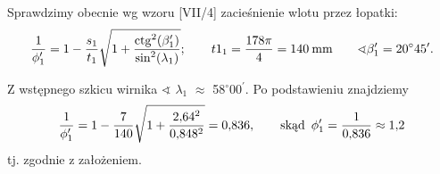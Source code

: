 \documentclass[a4paper]{book}
\DeclareMathOperator{\ctg}{ctg}
\begin{document}
Sprawdzimy obecnie wg wzoru [VII/4] zacieśnienie wlotu przez łopatki:
\begin{gather*}
%
\dfrac{1}{\phi_{1}^\prime} = 1 - \dfrac{s_1}{t_1}\sqrt{\strut 1 + \dfrac{\ctg^2(\beta_{1}^\prime)}{\sin^2(\lambda_1)}}; \qquad t1_1 = \dfrac{178\pi}{4} = 140 \: \text{mm} \qquad \sphericalangle \beta_{1}^\prime = 20^{\circ}45^\prime.
%
\end{gather*}
\par Z wstępnego szkicu wirnika $\sphericalangle$ $\lambda_1$ $\approx$ 58$^{\circ}$00$^\prime.$ Po podstawieniu znajdziemy
\begin{gather*}
%
\dfrac{1}{\phi_1^\prime} = 1 - \dfrac{7}{140}\sqrt{\strut 1 + \dfrac{2{,}64^2}{0{,}848^2}} = 0{,}836, \qquad \text{skąd} \enskip \phi_1^\prime = \dfrac{1}{0{,}836} \approx 1{,}2
%
\end{gather*}
tj. zgodnie z założeniem.	
\newpage
\end{document}
